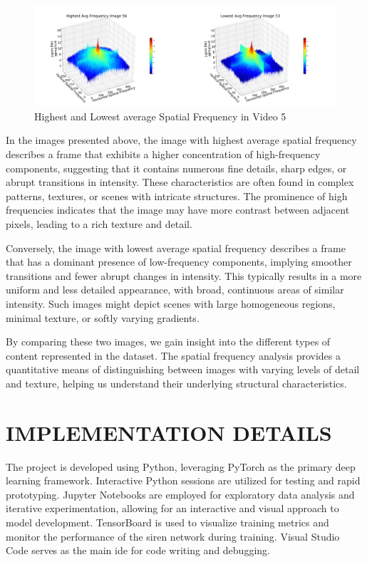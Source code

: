 \documentclass{ioereport}
\begin{document}
\begin{figure}[H]
    \centering
    \includegraphics[width=\linewidth]{assets/spatial_frequency/video5spatialfreq.png}
    \caption{Highest and Lowest average Spatial Frequency in Video 5}
    \label{fig:spatial-frequency-5}
\end{figure}

In the images presented above, the image with highest average spatial frequency describes a frame that exhibits a higher concentration of high-frequency components, suggesting that it contains numerous fine details, sharp edges, or abrupt transitions in intensity. These characteristics are often found in complex patterns, textures, or scenes with intricate structures. The prominence of high frequencies indicates that the image may have more contrast between adjacent pixels, leading to a rich texture and detail.

Conversely, the image with lowest average spatial frequency describes a frame that has a dominant presence of low-frequency components, implying smoother transitions and fewer abrupt changes in intensity. This typically results in a more uniform and less detailed appearance, with broad, continuous areas of similar intensity. Such images might depict scenes with large homogeneous regions, minimal texture, or softly varying gradients.

By comparing these two images, we gain insight into the different types of content represented in the dataset. The spatial frequency analysis provides a quantitative means of distinguishing between images with varying levels of detail and texture, helping us understand their underlying structural characteristics.
    
    \pagebreak

\section{\MakeUppercase{Implementation Details}}
The project is developed using Python, leveraging PyTorch as the primary deep learning framework. Interactive Python sessions are utilized for testing and rapid prototyping. Jupyter Notebooks are employed for exploratory data analysis and iterative experimentation, allowing for an interactive and visual approach to model development. TensorBoard is used to visualize training metrics and monitor the performance of the \gls{siren} network during training. Visual Studio Code serves as the main \gls{ide} for code writing and debugging.
\end{document}
